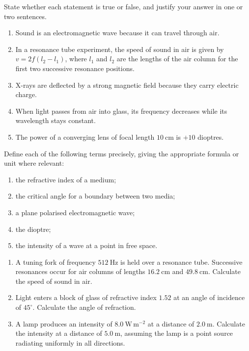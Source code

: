 \documentclass[11pt]{article}
\newcommand{\cle}[1]{{\popxbold\color{popdark}#1}}
\begin{document}
\begin{exercice}
State whether each statement is true or false, and justify your answer in one or two sentences.
\begin{enumerate}
\item Sound is an electromagnetic wave because it can travel through air.
\item In a resonance tube experiment, the speed of sound in air is given by $v = 2f(l_{2}-l_{1})$, where $l_{1}$ and $l_{2}$ are the lengths of the air column for the first two successive resonance positions.
\item X-rays are deflected by a strong magnetic field because they carry electric charge.
\item When light passes from air into glass, its frequency decreases while its wavelength stays constant.
\item The power of a converging lens of focal length $10\ \mathrm{cm}$ is $+10$ dioptres.
\end{enumerate}
\end{exercice}

\begin{exercice}[Definitions]
Define each of the following terms precisely, giving the appropriate formula or unit where relevant:
\begin{enumerate}
\item the \cle{refractive index} of a medium;
\item the \cle{critical angle} for a boundary between two media;
\item a \cle{plane polarised} electromagnetic wave;
\item the \cle{dioptre};
\item the \cle{intensity} of a wave at a point in free space.
\end{enumerate}
\end{exercice}

\begin{exercice}
\begin{enumerate}
\item A tuning fork of frequency $512\ \mathrm{Hz}$ is held over a resonance tube. Successive resonances occur for air columns of lengths $16.2\ \mathrm{cm}$ and $49.8\ \mathrm{cm}$. Calculate the speed of sound in air.
\item Light enters a block of glass of refractive index $1.52$ at an angle of incidence of $45^{\circ}$. Calculate the angle of refraction.
\item A lamp produces an intensity of $8.0\ \mathrm{W\,m^{-2}}$ at a distance of $2.0\ \mathrm{m}$. Calculate the intensity at a distance of $5.0\ \mathrm{m}$, assuming the lamp is a point source radiating uniformly in all directions.
\end{enumerate}
\end{exercice}
\end{document}
